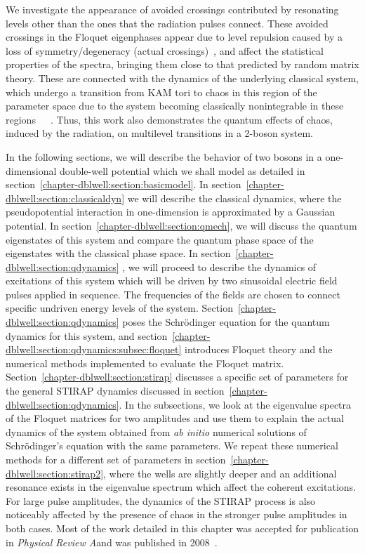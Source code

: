 We investigate the appearance of avoided crossings contributed by resonating levels other than the ones that the radiation pulses connect. These avoided crossings in the Floquet eigenphases appear due to level repulsion caused by a loss of symmetry/degeneracy (actual crossings)~\cite{reichl}, and affect the statistical properties of the spectra, bringing them close to that predicted by random matrix theory. These are connected with the dynamics of the underlying classical system, which undergo a transition from KAM tori to chaos in this region of the parameter space due to the system becoming classically nonintegrable in these regions~\cite{reichl}~\cite{latka:avoidedcrossings:chaos}~\cite{na-reichl:pbox}. Thus, this work also demonstrates the quantum effects of chaos, induced by the radiation, on multilevel transitions in a 2-boson system.

In the following sections, we will describe the behavior of two bosons in a one-dimensional double-well potential which we shall model as detailed in section~\ref{chapter-dblwell:section:basicmodel}. In section~\ref{chapter-dblwell:section:classicaldyn} we will describe the classical dynamics, where the pseudopotential interaction in one-dimension is approximated by a Gaussian potential. In section~\ref{chapter-dblwell:section:qmech}, we will discuss the quantum eigenstates of this system and compare the quantum phase space of the eigenstates with the classical phase space. In section~\ref{chapter-dblwell:section:qdynamics} , we will proceed to describe the dynamics of excitations of this system which will be driven by two sinusoidal electric field pulses applied in sequence. The frequencies of the fields are chosen to connect specific undriven energy levels of the system.  Section~\ref{chapter-dblwell:section:qdynamics} poses the Schr\"odinger equation for the quantum dynamics for this system, and section~\ref{chapter-dblwell:section:qdynamics:subsec:floquet} introduces Floquet theory and the numerical methods implemented to evaluate the Floquet matrix. Section~\ref{chapter-dblwell:section:stirap} discusses a specific set of parameters for the general STIRAP dynamics discussed in section~\ref{chapter-dblwell:section:qdynamics}. In the subsections, we look at the eigenvalue spectra of the Floquet matrices for two amplitudes and use them to explain the actual dynamics of the system obtained from \textit{ab initio} numerical solutions of Schr\"odinger's equation with the same parameters. We repeat these numerical methods for a different set of parameters in section~\ref{chapter-dblwell:section:stirap2}, where the wells are slightly deeper and an additional resonance exists in the eigenvalue spectrum which affect the coherent excitations. For large pulse amplitudes, the dynamics of the STIRAP process is also noticeably affected by the presence of chaos in the stronger pulse amplitudes in both cases. Most of the work detailed in this chapter was accepted for publication in \textit{Physical Review A}and was published in 2008~\cite{mypaper}.
%
